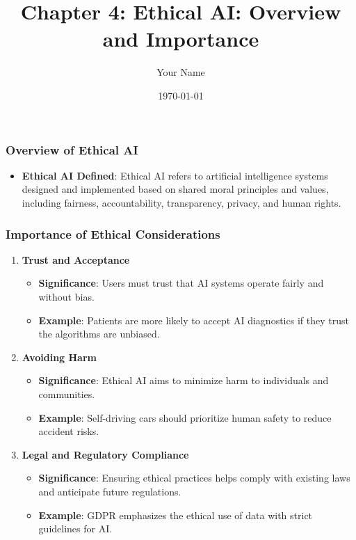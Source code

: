\documentclass{beamer}
\title{Chapter 4: Ethical AI: Overview and Importance}
\author{Your Name}
\institute{Your Institution}
\date{\today}
\begin{document}
\frame{\titlepage}

\begin{frame}[fragile]
    \titlepage
\end{frame}

\begin{frame}[fragile]
    \frametitle{Overview of Ethical AI}
    \begin{itemize}
        \item \textbf{Ethical AI Defined}: Ethical AI refers to artificial intelligence systems designed and implemented based on shared moral principles and values, including fairness, accountability, transparency, privacy, and human rights.
    \end{itemize}
\end{frame}

\begin{frame}[fragile]
    \frametitle{Importance of Ethical Considerations}
    \begin{enumerate}
        \item \textbf{Trust and Acceptance}
            \begin{itemize}
                \item \textbf{Significance}: Users must trust that AI systems operate fairly and without bias.
                \item \textbf{Example}: Patients are more likely to accept AI diagnostics if they trust the algorithms are unbiased.
            \end{itemize}
        
        \item \textbf{Avoiding Harm}
            \begin{itemize}
                \item \textbf{Significance}: Ethical AI aims to minimize harm to individuals and communities.
                \item \textbf{Example}: Self-driving cars should prioritize human safety to reduce accident risks.
            \end{itemize}
        
        \item \textbf{Legal and Regulatory Compliance}
            \begin{itemize}
                \item \textbf{Significance}: Ensuring ethical practices helps comply with existing laws and anticipate future regulations.
                \item \textbf{Example}: GDPR emphasizes the ethical use of data with strict guidelines for AI.
            \end{itemize}
        

\end{enumerate}
\end{frame}
\end{document}
